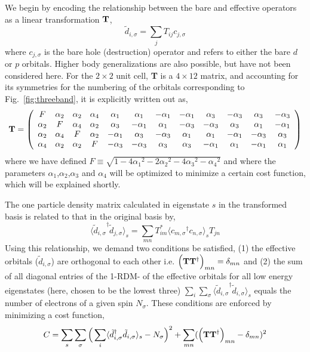 We begin by encoding the relationship between the bare and effective operators as a linear transformation ${\bf T}$, 
\begin{equation}
	\tilde{d}_{i,\sigma} = \sum_{j} T_{ij} c_{j,\sigma}
\end{equation}
where $c_{j,\sigma}$ is the bare hole (destruction) operator and refers to either the bare $d$ or $p$ orbitals. 
Higher body generalizations are also possible, but have not been considered here. 
For the $2\times2$ unit cell, {\bf T} is a $4 \times 12 $ matrix, and accounting for its symmetries 
for the numbering of the orbitals corresponding to Fig.~\ref{fig:threeband}, it is explicitly written out as, 
\begin{eqnarray}
{\bf T} = 
\left(
\begin{array}{cccccccccccc}
F        & \alpha_2 &        \alpha_2 &  \alpha_4 & \alpha_1 & \alpha_1 & -\alpha_1 & -\alpha_1 & \alpha_3 & -\alpha_3 & \alpha_3 & -\alpha_3 \\
\alpha_2 &  F       &        \alpha_4 &  \alpha_2 & \alpha_3 & -\alpha_1 & \alpha_1 & -\alpha_3 & -\alpha_3 & \alpha_3 & \alpha_1 & -\alpha_1 \\
\alpha_2 & \alpha_4 & F               &  \alpha_2 & -\alpha_1 & \alpha_3 & -\alpha_3 & \alpha_1 & \alpha_1 & -\alpha_1 & -\alpha_3 & \alpha_3 \\
\alpha_4 & \alpha_2 & \alpha_2        &   F       & -\alpha_3 & -\alpha_3 & \alpha_3 & \alpha_3 & -\alpha_1 & \alpha_1 & -\alpha_1 & \alpha_1 \\
\end{array}
\right)
\end{eqnarray}
where we have defined $F \equiv \sqrt{1-4{\alpha_1}^2 - 2{\alpha_2}^2 - 4 {\alpha_3}^2 -{\alpha_4}^2}$ and 
where the parameters $\alpha_1$,$\alpha_2$,$\alpha_3$ and $\alpha_4$ will be optimized to minimize a 
certain cost function, which will be explained shortly. 

The one particle density matrix calculated in eigenstate $s$ in the transformed basis is related to that in the original basis by,
\begin{equation}
	\langle {\tilde{d}_{i,\sigma}}^{\dagger} \tilde{d}_{j,\sigma} \rangle_{s} = \sum_{mn} T^{*}_{im} \langle {c_{m,\sigma}}^{\dagger} c_{n,\sigma} \rangle_{s} T_{jn}
\end{equation}
Using this relationship, we demand two conditions be satisfied, (1) the effective orbitals ($\tilde{d}_{i,\sigma}$) 
are orthogonal to each other i.e. $\Big({\bf T} {\bf T}^{\dagger}\Big)_{mn} = \delta_{mn}$
and (2) the sum of all diagonal entries of the 1-RDM- of the effective orbitals for all low energy eigenstates 
(here, chosen to be the lowest three) $\sum_{i} \sum_{\sigma} \langle {\tilde{d}_{i,\sigma}}^{\dagger} \tilde{d}_{i,\sigma} \rangle_{s}$ 
equals the number of electrons of a given spin $N_{\sigma}$. 
These conditions are enforced by minimizing a cost function,
\begin{equation}
C = \sum_{s} \sum_{\sigma} \Big( \sum_{i} \langle \tilde{d}_{i,\sigma}^{\dagger} \tilde{d}_{i,\sigma} \rangle_{s} - N_{\sigma} \Big)^{2} + \sum_{mn} ( \Big({\bf T} {\bf T}^{\dagger}\Big)_{mn} -\delta_{mn})^{2}
\label{eq:C}
\end{equation} 

